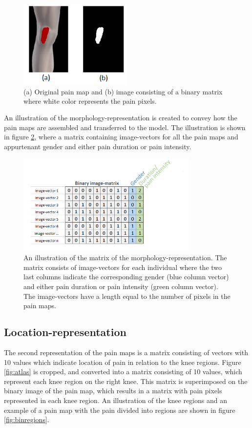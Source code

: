 \begin{figure} [H]
\centering
\includegraphics[width=0.5\textwidth]{figures/cropbin7}
\caption{(a) Original pain map and (b) image consisting of a binary matrix where white color represents the pain pixels.}
\label{fig:cropbin7}
\end{figure}

\noindent
An illustration of the morphology-representation is created to convey how the pain maps are assembled and transferred to the model. The illustration is shown in figure \ref{fig:binmatrix}, where a matrix containing image-vectors for all the pain maps and appurtenant gender and either pain duration or pain intensity.

\begin{figure} [H]
\centering
\includegraphics[width=0.8\textwidth]{figures/binaryimagematrix}
\caption{An illustration of the matrix of the morphology-representation. The matrix consists of image-vectors for each individual where the two last columns indicate the corresponding gender (blue column vector) and either pain duration or pain intensity (green column vector). The image-vectors have a length equal to the number of pixels in the pain maps.}
\label{fig:binmatrix}
\end{figure}

\subsection{Location-representation} \label{sec:Regions}
The second representation of the pain maps is a matrix consisting of vectors with 10 values which indicate location of pain in relation to the knee regions.
Figure \ref{fig:atlas} is cropped, and converted into a matrix consisting of 10 values, which represent each knee region on the right knee. This matrix is superimposed on the binary image of the pain map, which results in a matrix with pain pixels represented in each knee region. 
An illustration of the knee regions and an example of a pain map with the pain divided into regions are shown in figure \ref{fig:binregions}.

